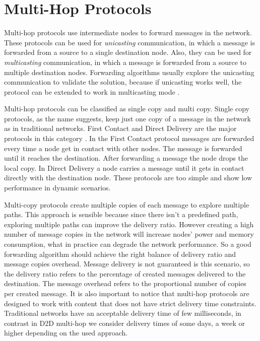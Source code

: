 \section{Multi-Hop Protocols}

Multi-hop protocols use intermediate nodes to forward messages in the network. These protocols can be used for \textit{unicasting} communication, in which a message is forwarded from
a source to a single destination node. Also, they can be used for \textit{multicasting} communication, in which a message is forwarded from a source to multiple destination nodes. Forwarding algorithms usually explore the unicasting communication to validate the solution, because if unicasting works well, the protocol can be extended to work in multicasting mode \citep{misra2016opportunistic}.

Multi-hop protocols can be classified as single copy and multi copy. Single copy protocols, as the name suggests, keep just one copy of a message in the network as in traditional networks. First Contact and Direct Delivery are the major protocols in this category \citep{misra2016opportunistic}. In the First Contact protocol messages are forwarded every time a node get in contact with other nodes. The message is forwarded until it reaches the destination. After forwarding a message the node drops the local copy. In Direct Delivery a node carries a message until it gets in contact directly with the destination node. These protocols are too simple and show low performance in dynamic scenarios.

Multi-copy protocols create multiple copies of each message to explore multiple paths. This approach is sensible because since there isn't a predefined path, exploring multiple paths can improve the delivery ratio. However creating a high number of message copies in the network will increase nodes' power and memory consumption, what in practice can degrade the network performance. So a good forwarding algorithm should achieve the right balance of delivery ratio and message copies overhead. Message delivery is not guaranteed is this scenario, so the delivery ratio refers to the percentage of created messages delivered to the destination. The message overhead refers to the proportional number of
copies per created message. It is also important to notice that multi-hop protocols are designed to work with content that does not have strict delivery time constraints. Traditional networks have an acceptable
delivery time of few milliseconds, in contrast in D2D multi-hop we consider delivery times of some days, a week or higher depending on the used approach.

